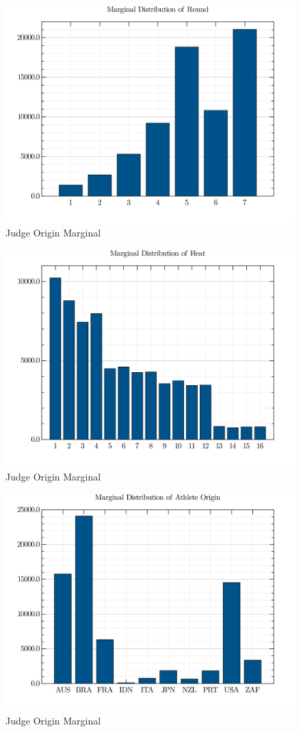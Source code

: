 \documentclass[12pt,a4paper]{article}
\begin{document}
 \begin{figure}
\centering
\includegraphics{visuals/marginals_RND.png}
\caption{Judge Origin Marginal}
\end{figure}
 \begin{figure}
\centering
\includegraphics{visuals/marginals_HEAT.png}
\caption{Judge Origin Marginal}
\end{figure}
 \begin{figure}
\centering
\includegraphics{visuals/marginals_ATH_orig.png}
\caption{Judge Origin Marginal}
\end{figure}
\end{document}
